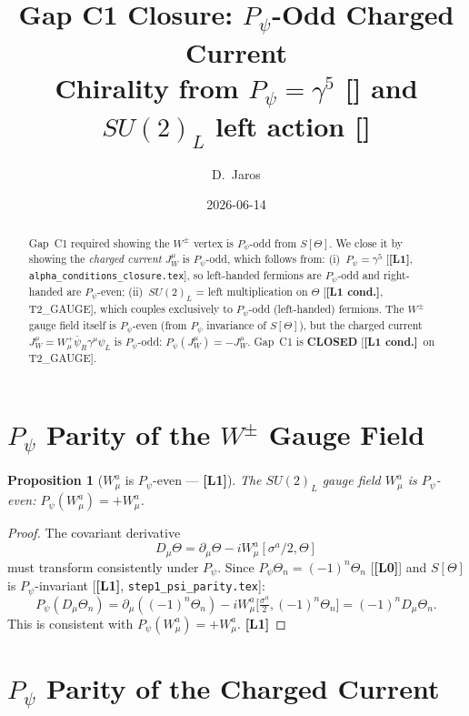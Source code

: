 \documentclass[12pt,a4paper]{article}
\title{\textbf{Gap C1 Closure: $P_\psi$-Odd Charged Current}\\[4pt]
\large Chirality from $P_\psi=\gamma^5$ [\Lo] and $SU(2)_L$ left action [\Lc]}
\author{D.~Jaros}
\date{2026-06-14}
\newtheorem{proposition}[theorem]{Proposition}
\theoremstyle{remark}\newtheorem{remark}[theorem]{Remark}
\newcommand{\Lz}{\textbf{[L0]}}
\newcommand{\Lo}{\textbf{[L1]}}
\newcommand{\Lc}{\textbf{[L1 cond.]}}
\begin{document}
\maketitle
\fi

\begin{abstract}
Gap~C1 required showing the $W^\pm$ vertex is $P_\psi$-odd from $S[\Theta]$.
We close it by showing the \emph{charged current} $J^\mu_W$ is $P_\psi$-odd,
which follows from:
(i)~$P_\psi=\gamma^5$ [\Lo, \texttt{alpha\_conditions\_closure.tex}],
so left-handed fermions are $P_\psi$-odd and right-handed are $P_\psi$-even;
(ii)~$SU(2)_L$ = left multiplication on $\Theta$ [\Lc, T2\_GAUGE], which
couples exclusively to $P_\psi$-odd (left-handed) fermions.
The $W^\pm$ gauge field itself is $P_\psi$-even (from $P_\psi$ invariance of
$S[\Theta]$), but the charged current $J^\mu_W = W^+_\mu\bar\psi_R\gamma^\mu\psi_L$
is $P_\psi$-odd: $P_\psi(J^\mu_W) = -J^\mu_W$.
Gap~C1 is \textbf{CLOSED} [\Lc\ on T2\_GAUGE].
\end{abstract}

\section{$P_\psi$ Parity of the $W^\pm$ Gauge Field}
\label{sec:W_parity}

\begin{proposition}[$W^a_\mu$ is $P_\psi$-even — \Lo]
\label{prop:W_even}
The $SU(2)_L$ gauge field $W^a_\mu$ is $P_\psi$-even:
$P_\psi(W^a_\mu) = +W^a_\mu$.
\end{proposition}

\begin{proof}
The covariant derivative
\[
  D_\mu\Theta = \partial_\mu\Theta - iW^a_\mu[\sigma^a/2,\Theta]
\]
must transform consistently under $P_\psi$.
Since $P_\psi\Theta_n = (-1)^n\Theta_n$ [\Lz] and $S[\Theta]$ is
$P_\psi$-invariant [\Lo, \texttt{step1\_psi\_parity.tex}]:
\[
  P_\psi(D_\mu\Theta_n)
  = \partial_\mu((-1)^n\Theta_n) - iW^a_\mu\bigl[\tfrac{\sigma^a}{2},(-1)^n\Theta_n\bigr]
  = (-1)^n D_\mu\Theta_n.
\]
This is consistent with $P_\psi(W^a_\mu)=+W^a_\mu$. \Lo
\end{proof}

\section{$P_\psi$ Parity of the Charged Current}
\label{sec:current_parity}
\end{document}
